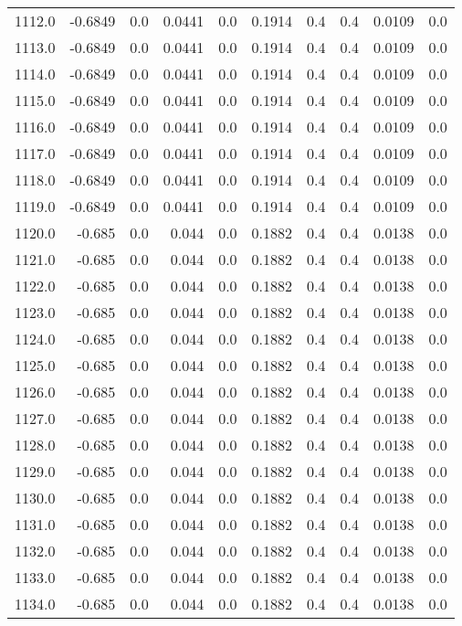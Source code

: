 \begin{longtable}{lrrrrrrrrr}
1112.0 & -0.6849 & 0.0 & 0.0441 & 0.0 & 0.1914 & 0.4 & 0.4 & 0.0109 & 0.0 \\
1113.0 & -0.6849 & 0.0 & 0.0441 & 0.0 & 0.1914 & 0.4 & 0.4 & 0.0109 & 0.0 \\
1114.0 & -0.6849 & 0.0 & 0.0441 & 0.0 & 0.1914 & 0.4 & 0.4 & 0.0109 & 0.0 \\
1115.0 & -0.6849 & 0.0 & 0.0441 & 0.0 & 0.1914 & 0.4 & 0.4 & 0.0109 & 0.0 \\
1116.0 & -0.6849 & 0.0 & 0.0441 & 0.0 & 0.1914 & 0.4 & 0.4 & 0.0109 & 0.0 \\
1117.0 & -0.6849 & 0.0 & 0.0441 & 0.0 & 0.1914 & 0.4 & 0.4 & 0.0109 & 0.0 \\
1118.0 & -0.6849 & 0.0 & 0.0441 & 0.0 & 0.1914 & 0.4 & 0.4 & 0.0109 & 0.0 \\
1119.0 & -0.6849 & 0.0 & 0.0441 & 0.0 & 0.1914 & 0.4 & 0.4 & 0.0109 & 0.0 \\
1120.0 & -0.685 & 0.0 & 0.044 & 0.0 & 0.1882 & 0.4 & 0.4 & 0.0138 & 0.0 \\
1121.0 & -0.685 & 0.0 & 0.044 & 0.0 & 0.1882 & 0.4 & 0.4 & 0.0138 & 0.0 \\
1122.0 & -0.685 & 0.0 & 0.044 & 0.0 & 0.1882 & 0.4 & 0.4 & 0.0138 & 0.0 \\
1123.0 & -0.685 & 0.0 & 0.044 & 0.0 & 0.1882 & 0.4 & 0.4 & 0.0138 & 0.0 \\
1124.0 & -0.685 & 0.0 & 0.044 & 0.0 & 0.1882 & 0.4 & 0.4 & 0.0138 & 0.0 \\
1125.0 & -0.685 & 0.0 & 0.044 & 0.0 & 0.1882 & 0.4 & 0.4 & 0.0138 & 0.0 \\
1126.0 & -0.685 & 0.0 & 0.044 & 0.0 & 0.1882 & 0.4 & 0.4 & 0.0138 & 0.0 \\
1127.0 & -0.685 & 0.0 & 0.044 & 0.0 & 0.1882 & 0.4 & 0.4 & 0.0138 & 0.0 \\
1128.0 & -0.685 & 0.0 & 0.044 & 0.0 & 0.1882 & 0.4 & 0.4 & 0.0138 & 0.0 \\
1129.0 & -0.685 & 0.0 & 0.044 & 0.0 & 0.1882 & 0.4 & 0.4 & 0.0138 & 0.0 \\
1130.0 & -0.685 & 0.0 & 0.044 & 0.0 & 0.1882 & 0.4 & 0.4 & 0.0138 & 0.0 \\
1131.0 & -0.685 & 0.0 & 0.044 & 0.0 & 0.1882 & 0.4 & 0.4 & 0.0138 & 0.0 \\
1132.0 & -0.685 & 0.0 & 0.044 & 0.0 & 0.1882 & 0.4 & 0.4 & 0.0138 & 0.0 \\
1133.0 & -0.685 & 0.0 & 0.044 & 0.0 & 0.1882 & 0.4 & 0.4 & 0.0138 & 0.0 \\
1134.0 & -0.685 & 0.0 & 0.044 & 0.0 & 0.1882 & 0.4 & 0.4 & 0.0138 & 0.0 \\

\end{longtable}
